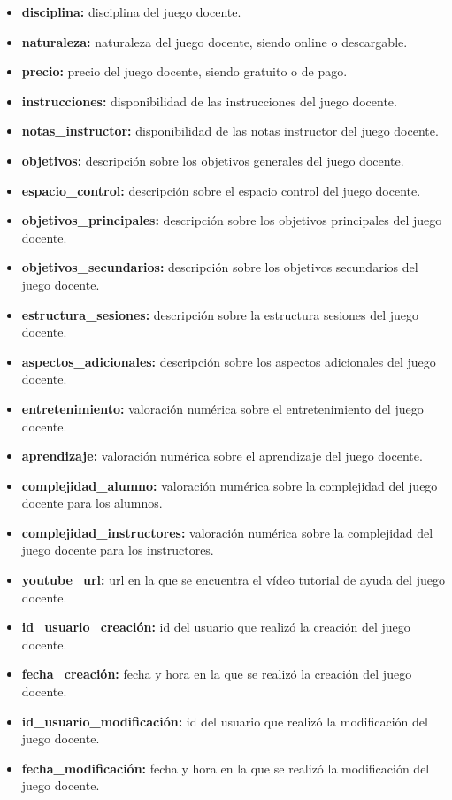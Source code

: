 \begin{itemize}
\begin{itemize}
            \item \textbf{disciplina:} disciplina del juego docente.
            \item \textbf{naturaleza:} naturaleza del juego docente, siendo online o descargable.
            \item \textbf{precio:} precio del juego docente, siendo gratuito o de pago.
            \item \textbf{instrucciones:} disponibilidad de las instrucciones del juego docente.
            \item \textbf{notas\_instructor:} disponibilidad de las notas instructor del juego docente.
            \item \textbf{objetivos:}  descripción sobre los objetivos generales del juego docente.
            \item \textbf{espacio\_control:} descripción sobre el espacio control del juego docente.
            \item \textbf{objetivos\_principales:}  descripción sobre los objetivos principales del juego docente.
            \item \textbf{objetivos\_secundarios:}  descripción sobre los objetivos secundarios del juego docente.
            \item \textbf{estructura\_sesiones:} descripción sobre la estructura sesiones del juego docente.
            \item \textbf{aspectos\_adicionales:} descripción sobre los aspectos adicionales del juego docente.
            \item \textbf{entretenimiento:} valoración numérica sobre el entretenimiento del juego docente.
            \item \textbf{aprendizaje:} valoración numérica sobre el aprendizaje del juego docente.
            \item \textbf{complejidad\_alumno:} valoración numérica sobre la complejidad del juego docente para los alumnos.
            \item \textbf{complejidad\_instructores:} valoración numérica sobre la complejidad del juego docente para los instructores.
            \item \textbf{youtube\_url:} url en la que se encuentra el vídeo tutorial de ayuda del juego docente.
            \item \textbf{id\_usuario\_creación:} id del usuario que realizó la  creación del juego docente.
            \item \textbf{fecha\_creación:} fecha y hora en la que se realizó la creación del juego docente.
            \item \textbf{id\_usuario\_modificación:} id del usuario que realizó la  modificación del juego docente.
            \item \textbf{fecha\_modificación:} fecha y hora en la que se realizó la  modificación del juego docente.


\end{itemize}
\end{itemize}
